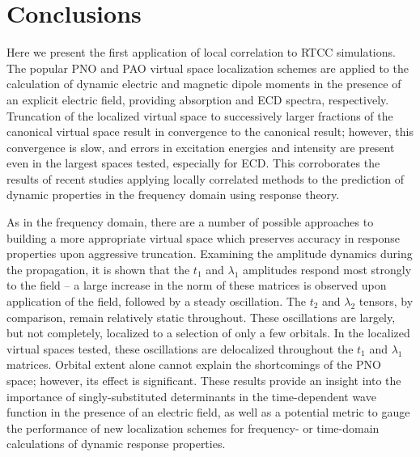 
\section{Conclusions} \label{conc}
Here we present the first application of local correlation to RTCC
simulations. The popular PNO and PAO virtual space localization schemes are
applied to the calculation of dynamic electric and magnetic dipole moments
in the presence of an explicit electric field, providing absorption and
ECD spectra, respectively.  Truncation of the localized virtual space to
successively larger fractions of the canonical virtual space result in
convergence to the canonical result; however, this convergence is slow,
and errors in excitation energies and intensity are present even in the
largest spaces tested, especially for ECD. This corroborates the results
of recent studies applying locally correlated methods to the prediction
of dynamic properties in the frequency domain using response theory.

As in the frequency domain, there are a number of possible approaches
to building a more appropriate virtual space which preserves accuracy in
response properties upon aggressive truncation. Examining the amplitude
dynamics during the propagation, it is shown that the $t_1$ and $\lambda_1$
amplitudes respond most strongly to the field -- a large increase in the
norm of these matrices is observed upon application of the field, followed
by a steady oscillation. The $t_2$ and $\lambda_2$ tensors, by comparison,
remain relatively static throughout. 
These oscillations are largely, but not completely, localized to a selection 
of only a few orbitals.
In the localized virtual spaces tested,
these oscillations are delocalized throughout the $t_1$ and $\lambda_1$
matrices. Orbital extent alone cannot explain the shortcomings of 
the PNO space; however, its effect is significant. 
These results provide an insight into the importance of 
singly-substituted determinants in the time-dependent wave function in the 
presence of an electric field, as well as a potential metric to gauge the 
performance of new localization schemes for frequency- or time-domain 
calculations of dynamic response properties.
